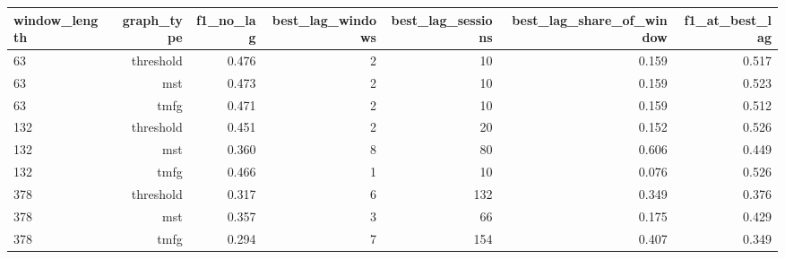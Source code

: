 \begin{tabular}{lrrrrrr}
\toprule
window\_length & graph\_type & f1\_no\_lag & best\_lag\_windows & best\_lag\_sessions & best\_lag\_share\_of\_window & f1\_at\_best\_lag \\
\midrule
63 & threshold & 0.476 & 2 & 10 & 0.159 & 0.517 \\
63 & mst & 0.473 & 2 & 10 & 0.159 & 0.523 \\
63 & tmfg & 0.471 & 2 & 10 & 0.159 & 0.512 \\
132 & threshold & 0.451 & 2 & 20 & 0.152 & 0.526 \\
132 & mst & 0.360 & 8 & 80 & 0.606 & 0.449 \\
132 & tmfg & 0.466 & 1 & 10 & 0.076 & 0.526 \\
378 & threshold & 0.317 & 6 & 132 & 0.349 & 0.376 \\
378 & mst & 0.357 & 3 & 66 & 0.175 & 0.429 \\
378 & tmfg & 0.294 & 7 & 154 & 0.407 & 0.349 \\
\bottomrule
\end{tabular}
